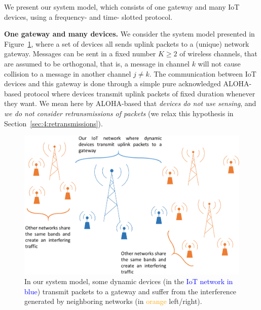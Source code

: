 We present our system model, which consists of one gateway and many IoT devices, using a frequency- and time- slotted protocol.

\textbf{One gateway and many devices.}
%
We consider the system model presented in Figure~\ref{fig:41:system_model1}, where a set of devices all sends uplink packets to a (unique) network gateway.
Messages can be sent in a fixed number $K\geq2$ of wireless channels,
that are assumed to be orthogonal, that is, a message in channel $k$ will not cause collision to a message in another channel $j \neq k$.
The communication between IoT devices and this gateway is done through a simple pure acknowledged ALOHA-based protocol where devices transmit uplink packets of fixed duration whenever they want.
We mean here by ALOHA-based that \emph{devices do not use sensing}, and \emph{we do not consider retransmissions of packets} (we relax this hypothesis in Section~\ref{sec:4:retransmissions}).
%

\begin{figure}[!t]
    \centering
    \includegraphics[width=0.70\linewidth]{system_model1.eps}
    \caption[In our system model, some dynamic devices (in the IoT network) transmit packets to a gateway and suffer from the interference generated by neighboring networks.]{In our system model, some dynamic devices (in the \textcolor{blue}{IoT network in blue}) transmit packets to a gateway and suffer from the interference generated by neighboring networks (in \textcolor{orange}{orange} left/right).}
    \label{fig:41:system_model1}
\end{figure}

